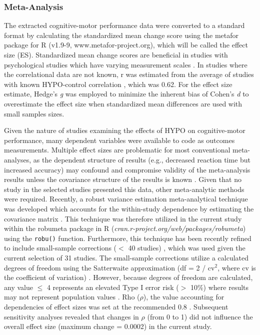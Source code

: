 \subsubsection{Meta-Analysis}
The extracted cognitive-motor performance data were converted to a standard format by calculating the standardized mean change score using the metafor package for R (v1.9-9, www.metafor-project.org), which will be called the effect size (ES). Standardized mean change scores are beneficial in studies with psychological studies which have varying measurement scales \cite{morris_combining_2002}. In studies where the correlational data are not known, r was estimated from the average of studies with known HYPO-control correlation \cite{wittbrodt_fluid_2015,watson_mild_2015}, which was 0.62. For the effect size estimate, Hedge’s \textit{g} was employed to minimize the inherent bias of Cohen’s \textit{d} to overestimate the effect size when standardized mean differences are used with small samples sizes.   

Given the nature of studies examining the effects of HYPO on cognitive-motor performance, many dependent variables were available to code as outcomes measurements. Multiple effect sizes are problematic for most conventional meta-analyses, as the dependent structure of results (e.g., decreased reaction time but increased accuracy) may confound and compromise validity of the meta-analysis results unless the covariance structure of the results is known \cite{scammacca_meta-analysis_2014}. Given that no study in the selected studies presented this data, other meta-analytic methods were required. Recently, a robust variance estimation meta-analytical technique was developed which accounts for the within-study dependence by estimating the covariance matrix \cite{hedges_robust_2010}. This technique was therefore utilized in the current study within the robumeta package in R (\textit{cran.r-project.org/web/packages/robumeta}) using the \texttt{robu()} function. Furthermore, this technique has been recently refined to include small-sample corrections (${<}$ 40 studies) \cite{tipton_small_2015}, which was used given the current selection of 31 studies. The small-sample corrections utilize a calculated degrees of freedom using the Satterwaite approximation (df = 2 / cv${^2}$, where cv is the coefficient of variation) \cite{tipton_small_2015}. However, because degrees of freedom are calculated, any value ${\le}$ 4 represents an elevated Type I error risk (${>}$ 10\%) where results may not represent population values \cite{tipton_small_2015}. Rho (${\rho}$), the value accounting for dependencies of effect sizes was set at the recommended 0.8 \cite{tanner-smith_robust_2014}. Subsequent sensitivity analyses revealed that changes in ${\rho}$ (from 0 to 1) did not influence the overall effect size (maximum change = 0.0002) in the current study.

